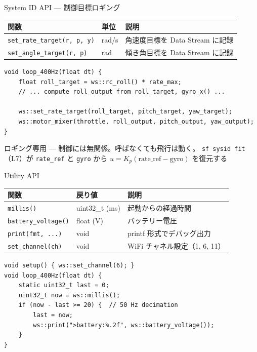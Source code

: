 \begin{frame}[fragile]{System ID API --- 制御目標ロギング}
  \vspace{0.3em}
  {\small
  \begin{tabular}{lll}
    \hline
    \textbf{関数} & \textbf{単位} & \textbf{説明} \\
    \hline
    \texttt{set\_rate\_target(r, p, y)}  & rad/s & 角速度目標を Data Stream に記録 \\
    \texttt{set\_angle\_target(r, p)}    & rad   & 傾き角目標を Data Stream に記録 \\
    \hline
  \end{tabular}
  }

  \vspace{0.3em}

  \begin{lstlisting}[style=sfcpp, basicstyle=\ttfamily\scriptsize]
void loop_400Hz(float dt) {
    float roll_target = ws::rc_roll() * rate_max;
    // ... compute roll_output from roll_target, gyro_x() ...

    ws::set_rate_target(roll_target, pitch_target, yaw_target);
    ws::motor_mixer(throttle, roll_output, pitch_output, yaw_output);
}
  \end{lstlisting}

  \vspace{0.2em}
  {\footnotesize {} ロギング専用 --- 制御には無関係。呼ばなくても飛行は動く。
  \texttt{sf sysid fit}（L7）が \texttt{rate\_ref} と \texttt{gyro} から
  $u = K_p(\text{rate\_ref} - \text{gyro})$ を復元する}
\end{frame}

\begin{frame}[fragile]{Utility API}
  \vspace{0.3em}
  {\small
  \begin{tabular}{lll}
    \hline
    \textbf{関数} & \textbf{戻り値} & \textbf{説明} \\
    \hline
    \texttt{millis()}           & uint32\_t (ms) & 起動からの経過時間 \\
    \texttt{battery\_voltage()} & float (V)      & バッテリー電圧 \\
    \texttt{print(fmt, ...)}    & void           & printf 形式でデバッグ出力 \\
    \texttt{set\_channel(ch)}   & void           & WiFi チャネル設定（1, 6, 11） \\
    \hline
  \end{tabular}
  }

  \vspace{0.3em}

  \begin{lstlisting}[style=sfcpp, basicstyle=\ttfamily\scriptsize]
void setup() { ws::set_channel(6); }
void loop_400Hz(float dt) {
    static uint32_t last = 0;
    uint32_t now = ws::millis();
    if (now - last >= 20) {  // 50 Hz decimation
        last = now;
        ws::print(">battery:%.2f", ws::battery_voltage());
    }
}
  \end{lstlisting}
\end{frame}

